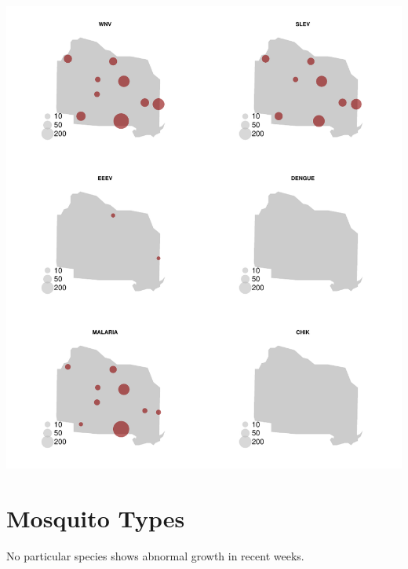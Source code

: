 \documentclass{article}
\begin{document}
\includegraphics{mosquitoReport-007}


\section*{Mosquito Types}
\hrulefill
\vspace{5mm}

No particular species shows abnormal growth in recent weeks.  
\end{document}
